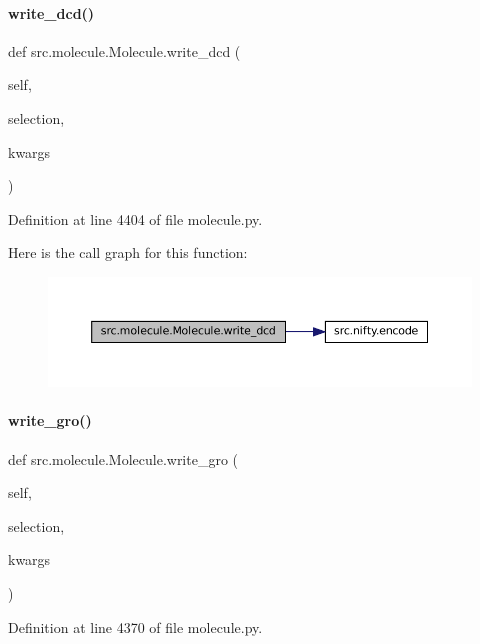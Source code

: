 \paragraph{\texorpdfstring{write\+\_\+dcd()}{write\_dcd()}}
{\footnotesize\ttfamily def src.\+molecule.\+Molecule.\+write\+\_\+dcd (\begin{DoxyParamCaption}\item[{}]{self,  }\item[{}]{selection,  }\item[{}]{kwargs }\end{DoxyParamCaption})}



Definition at line 4404 of file molecule.\+py.

Here is the call graph for this function\+:
\nopagebreak
\begin{figure}[H]
\begin{center}
\leavevmode
\includegraphics[width=350pt]{classsrc_1_1molecule_1_1Molecule_a722ba2597f067fc042169926c0b37274_cgraph}
\end{center}
\end{figure}
\mbox{\label{classsrc_1_1molecule_1_1Molecule_accdd08d1cdef8a51da59e1fc2268c7d8}} 
\paragraph{\texorpdfstring{write\+\_\+gro()}{write\_gro()}}
{\footnotesize\ttfamily def src.\+molecule.\+Molecule.\+write\+\_\+gro (\begin{DoxyParamCaption}\item[{}]{self,  }\item[{}]{selection,  }\item[{}]{kwargs }\end{DoxyParamCaption})}



Definition at line 4370 of file molecule.\+py.

